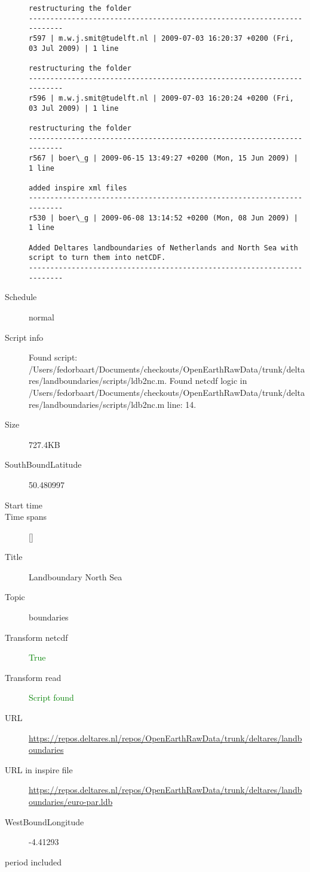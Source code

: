 \documentclass[9]{report}
\begin{document}
\begin{description}
\begin{verbatim}
restructuring the folder
------------------------------------------------------------------------
r597 | m.w.j.smit@tudelft.nl | 2009-07-03 16:20:37 +0200 (Fri, 03 Jul 2009) | 1 line

restructuring the folder
------------------------------------------------------------------------
r596 | m.w.j.smit@tudelft.nl | 2009-07-03 16:20:24 +0200 (Fri, 03 Jul 2009) | 1 line

restructuring the folder
------------------------------------------------------------------------
r567 | boer\_g | 2009-06-15 13:49:27 +0200 (Mon, 15 Jun 2009) | 1 line

added inspire xml files
------------------------------------------------------------------------
r530 | boer\_g | 2009-06-08 13:14:52 +0200 (Mon, 08 Jun 2009) | 1 line

Added Deltares landboundaries of Netherlands and North Sea with script to turn them into netCDF.
------------------------------------------------------------------------

\end{verbatim}
  \item[Schedule] normal
  \item[Script info] Found script: /Users/fedorbaart/Documents/checkouts/OpenEarthRawData/trunk/deltares/landboundaries/scripts/ldb2nc.m.
Found netcdf logic in /Users/fedorbaart/Documents/checkouts/OpenEarthRawData/trunk/deltares/landboundaries/scripts/ldb2nc.m line: 14.
  \item[Size] 727.4KB
  \item[SouthBoundLatitude] 50.480997
  \item[Start time] 
  \item[Time spans] []
  \item[Title]  Landboundary North Sea 
  \item[Topic] boundaries
  \item[Transform netcdf] \textcolor{green}{True}
  \item[Transform read] \textcolor{green}{Script found}
  \item[URL] \href{https://repos.deltares.nl/repos/OpenEarthRawData/trunk/deltares/landboundaries}{https://repos.deltares.nl/repos/OpenEarthRawData/trunk/deltares/landboundaries}
  \item[URL in inspire file] \href{https://repos.deltares.nl/repos/OpenEarthRawData/trunk/deltares/landboundaries/euro-par.ldb}{https://repos.deltares.nl/repos/OpenEarthRawData/trunk/deltares/landboundaries/euro-par.ldb}
  \item[WestBoundLongitude] -4.41293
  \item[period included] 
\end{description}
\end{document}
